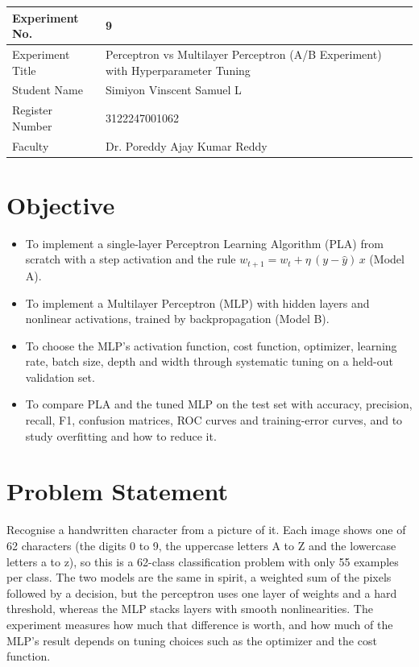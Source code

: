 \documentclass[12pt,a4paper]{article}
\begin{document}
\begin{tabular}{|p{4cm}|p{11cm}|}
\hline
Experiment No. & 9 \\ \hline
Experiment Title & Perceptron vs Multilayer Perceptron (A/B Experiment) with Hyperparameter
Tuning\footnotemark\\ \hline
Student Name & Simiyon Vinscent Samuel L \\ \hline
Register Number & 3122247001062 \\ \hline
Faculty & Dr. Poreddy Ajay Kumar Reddy \\ \hline
\end{tabular}

\section{Objective}
\begin{itemize}[nosep]
\item To implement a single-layer Perceptron Learning Algorithm (PLA) from scratch with a step
activation and the rule $w_{t+1} = w_t + \eta\,(y - \hat{y})\,x$ (Model A).
\item To implement a Multilayer Perceptron (MLP) with hidden layers and nonlinear activations,
trained by backpropagation (Model B).
\item To choose the MLP's activation function, cost function, optimizer, learning rate, batch
size, depth and width through systematic tuning on a held-out validation set.
\item To compare PLA and the tuned MLP on the test set with accuracy, precision, recall, F1,
confusion matrices, ROC curves and training-error curves, and to study overfitting and how to
reduce it.
\end{itemize}

\section{Problem Statement}
Recognise a handwritten character from a picture of it. Each image shows one of 62 characters
(the digits 0 to 9, the uppercase letters A to Z and the lowercase letters a to z), so this is a
62-class classification problem with only 55 examples per class. The two models are the same in
spirit, a weighted sum of the pixels followed by a decision, but the perceptron uses one layer of
weights and a hard threshold, whereas the MLP stacks layers with smooth nonlinearities. The
experiment measures how much that difference is worth, and how much of the MLP's result depends
on tuning choices such as the optimizer and the cost function.
\end{document}
